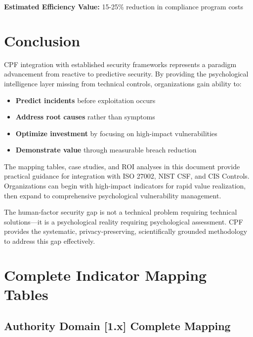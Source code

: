 \documentclass[11pt,a4paper]{article}
\begin{document}
\textbf{Estimated Efficiency Value:} 15-25\% reduction in compliance program costs

\section{Conclusion}

CPF integration with established security frameworks represents a paradigm advancement from reactive to predictive security. By providing the psychological intelligence layer missing from technical controls, organizations gain ability to:

\begin{itemize}
\item \textbf{Predict incidents} before exploitation occurs
\item \textbf{Address root causes} rather than symptoms
\item \textbf{Optimize investment} by focusing on high-impact vulnerabilities
\item \textbf{Demonstrate value} through measurable breach reduction
\end{itemize}

The mapping tables, case studies, and ROI analyses in this document provide practical guidance for integration with ISO 27002, NIST CSF, and CIS Controls. Organizations can begin with high-impact indicators for rapid value realization, then expand to comprehensive psychological vulnerability management.

The human-factor security gap is not a technical problem requiring technical solutions---it is a psychological reality requiring psychological assessment. CPF provides the systematic, privacy-preserving, scientifically grounded methodology to address this gap effectively.

\appendix

\section{Complete Indicator Mapping Tables}

\subsection{Authority Domain [1.x] Complete Mapping}
\end{document}
